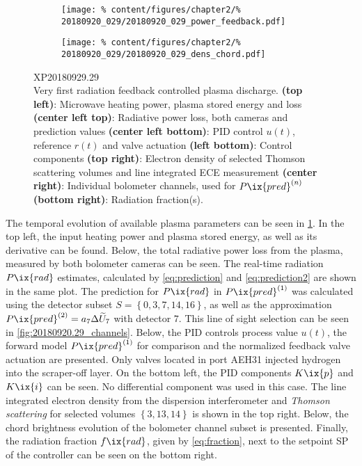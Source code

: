 %
            \begin{figure}[t]%
                \centering%
                \begin{subfigure}{0.49\textwidth}%
                    \texttt{[image: \%
                        content/figures/chapter2/\%
                        20180920\_029/20180920\_029\_power\_feedback.pdf]}%
                \end{subfigure}
                \begin{subfigure}{0.49\textwidth}%
                    \texttt{[image: \%
                        content/figures/chapter2/\%
                        20180920\_029/20180920\_029\_dens\_chord.pdf]}%
                \end{subfigure}%
                \caption{%
                    XP20180929.29\\%
                    Very first radiation feedback controlled plasma discharge. \textbf{(top left)}: Microwave heating power, plasma stored energy and loss \textbf{(center left top)}: Radiative power loss, both cameras and prediction values \textbf{(center left bottom)}: PID control $u\left(t\right)$, reference $r\left(t\right)$ and valve actuation \textbf{(left bottom)}: Control components \textbf{(top right)}: Electron density of selected Thomson scattering volumes and line integrated ECE measurement \textbf{(center right)}: Individual bolometer channels, used for $P\ix{pred}^{\left(n\right)}$ \textbf{(bottom right)}: Radiation fraction(s).}\label{fig:20180920.29_PDF}%
            \end{figure}%
%
            The temporal evolution of available plasma parameters can be seen in \cref{fig:20180920.29_PDF}. In the top left, the input heating power and plasma stored energy, as well as its derivative can be found. Below, the total radiative power loss from the plasma, measured by both bolometer cameras can be seen. The real-time radiation $P\ix{rad}$ estimates, calculated by \cref{eq:prediction} and \ref{eq:prediction2} are shown in the same plot. The prediction for $P\ix{rad}$ in $P\ix{pred}^{\left(1\right)}$ was calculated using the detector subset $S=\left\{0, 3, 7, 14, 16\right\}$, as well as the approximation $P\ix{pred}^{\left(2\right)}=a_{7}\Delta\widetilde{U}_{7}$ with detector $7$. This line of sight selection can be seen in \cref{fig:20180920.29_channels}. Below, the PID controls process value $u\left(t\right)$, the forward model $P\ix{pred}^{\left(1\right)}$ for comparison and the normalized feedback valve actuation are presented. Only valves located in port AEH31 injected hydrogen into the scraper-off layer. On the bottom left, the PID components $K\ix{p}$ and $K\ix{i}$ can be seen. No differential component was used in this case. The line integrated electron density from the dispersion interferometer and \textit{Thomson scattering} for selected volumes $\left\{3, 13, 14\right\}$ is shown in the top right. Below, the chord brightness evolution of the bolometer channel subset is presented. Finally, the radiation fraction $f\ix{rad}$, given by \cref{eq:fraction}, next to the setpoint SP of the controller can be seen on the bottom right.\\%
